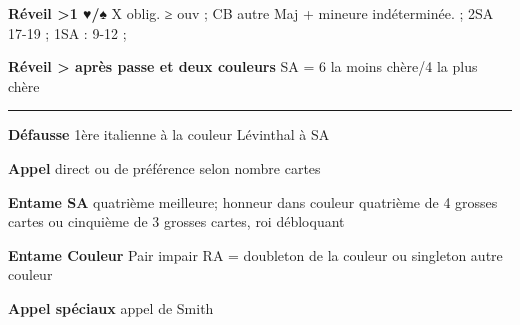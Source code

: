 \documentclass[twoside,a5paper]{article} \listfiles
\newcommand{\g}[1]{\textbf{#1}}
\begin{document}
{\begin{multicols}{2}
	 

	  \g{Réveil >1 ♥/♠} \newline
	 X oblig. ≥ ouv  ; CB autre Maj + mineure indéterminée. ; 2SA 17-19 ; 1SA : 9-12   ; 


	\g{Réveil > après passe et deux couleurs} SA = 6 la moins chère/4	 la plus chère
	 
	 \rule{\linewidth}{1.5pt}
	 		 
	  \g{Défausse} \newline
	  1ère italienne à la couleur \newline
	  Lévinthal à SA
	  
	  
	  \g{Appel} \newline
	 direct ou de préférence selon nombre cartes
	 
	   						 
	 
	 
	 \g{Entame SA} \newline
	quatrième meilleure; honneur dans couleur quatrième de 4 grosses cartes ou cinquième de 3 grosses cartes, roi débloquant


	\g{Entame Couleur} \newline
	Pair impair\newline
	RA = doubleton de la couleur ou singleton autre couleur


	\g{Appel spéciaux} \newline
	appel de Smith

	
	\end{multicols}
}
\end{document}
